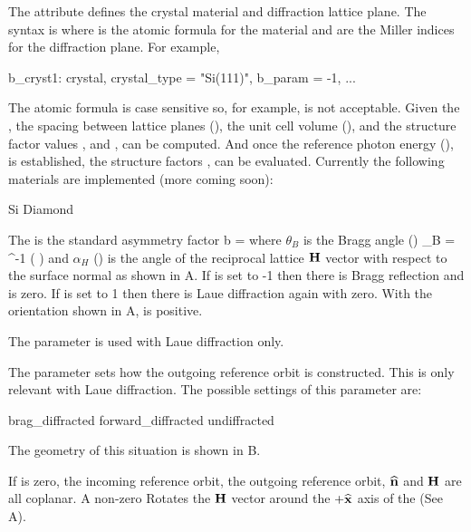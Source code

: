 The  attribute defines the crystal material and
diffraction lattice plane. The syntax is  where 
is the atomic formula for the material and  are the Miller
indices for the diffraction plane. For example,
\begin{example}
  b_cryst1: crystal, crystal_type = "Si(111)", b_param = -1, ...
\end{example}
The atomic formula is case sensitive so, for example, 
is not acceptable.  Given the , the spacing between
lattice planes (), the unit cell volume
(), and the structure factor\cite{b:batterman} values
, and , can be computed. And once the reference
photon energy (), is established, the structure factors
,  can be evaluated.
Currently the following materials are implemented (more coming soon):
\begin{example}
  Si
  Diamond
\end{example}

The  is the standard asymmetry factor
\Begineq
  b =  
\Endeq
where $\theta_B$ is the Bragg angle () 
\Begineq
  \theta_B = \sin^{-1} \left(  \right)
\Endeq
and $\alpha_H$ () is the angle of the reciprocal
lattice ${\bf H}$ vector with respect to the surface normal as shown in
A.  If  is set to -1 then there is
Bragg reflection and  is zero. If  is set to 1
then there is Laue diffraction again with  zero. With the
orientation shown in A,  is positive.

The  parameter is used with Laue diffraction only.

The  parameter sets how the outgoing reference
orbit is constructed. This is only relevant with Laue diffraction.
The possible settings of this parameter are:
\begin{example}
  brag_diffracted
  forward_diffracted
  undiffracted
\end{example}
The geometry of this situation is shown in B.

If  is zero, the incoming reference orbit, the outgoing
reference orbit, ${\widehat{\bf n}}$ and ${\bf H}$ are all coplanar. A non-zero
 Rotates the ${\bf H}$ vector around the $+{\widehat{\bf x}}$ axis
of the  (See A).

